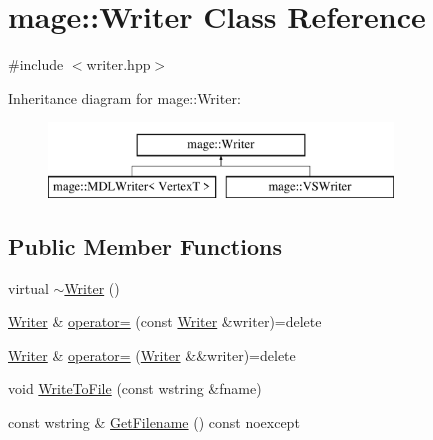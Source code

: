 \hypertarget{classmage_1_1_writer}{}\section{mage\+:\+:Writer Class Reference}
\label{classmage_1_1_writer}


{\ttfamily \#include $<$writer.\+hpp$>$}

Inheritance diagram for mage\+:\+:Writer\+:\begin{figure}[H]
\begin{center}
\leavevmode
\includegraphics[height=2.000000cm]{classmage_1_1_writer}
\end{center}
\end{figure}
\subsection*{Public Member Functions}
\begin{DoxyCompactItemize}
\item 
virtual \hyperlink{classmage_1_1_writer_aeeb30d6afb1a271b4ad294889054caec}{$\sim$\+Writer} ()
\item 
\hyperlink{classmage_1_1_writer}{Writer} \& \hyperlink{classmage_1_1_writer_a81ea888d1b170515713432ca28629ceb}{operator=} (const \hyperlink{classmage_1_1_writer}{Writer} \&writer)=delete
\item 
\hyperlink{classmage_1_1_writer}{Writer} \& \hyperlink{classmage_1_1_writer_aefbdd9a659983b543358cc8277ab890c}{operator=} (\hyperlink{classmage_1_1_writer}{Writer} \&\&writer)=delete
\item 
void \hyperlink{classmage_1_1_writer_aa65ca7f473b3c95e94c72e25efc4c4c8}{Write\+To\+File} (const wstring \&fname)
\item 
const wstring \& \hyperlink{classmage_1_1_writer_aedbc8d5fa02444ecba2e040ca8e98281}{Get\+Filename} () const noexcept
\end{DoxyCompactItemize}
